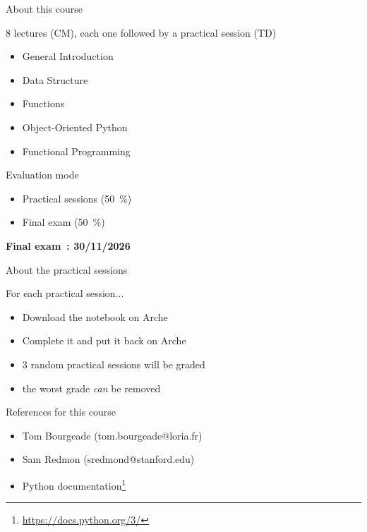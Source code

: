 \documentclass[serif, aspectratio=169]{beamer}
\begin{document}
\begin{frame}{About this course} %
    \begin{block}{8 lectures (CM), each one followed by a practical session (TD)}
        \begin{itemize}
            \item General Introduction
            \item Data Structure
            \item Functions
            \item Object-Oriented Python
            \item Functional Programming
        \end{itemize}
    \end{block}
    \pause
    \begin{block}{Evaluation mode}
        \begin{itemize}
            \item Practical sessions (50~\%) 
            \item Final exam (50~\%)
        \end{itemize}
    \end{block}
    \pause
    \hfill \textbf{Final exam~: 30/11/2026}
\end{frame}

\begin{frame}{About the practical sessions}
    \begin{block}{For each practical session...}
        \begin{itemize}
            \item Download the notebook on Arche
            \item Complete it and put it back on Arche
        \end{itemize}
    \end{block}
    \begin{block}{}
        \begin{itemize}
            \item 3 random practical sessions will be graded
            \item the worst grade \textit{can} be removed
        \end{itemize}
    \end{block}
\end{frame}

\begin{frame}{References for this course}
    \begin{block}{}
        \begin{itemize}
            \item Tom Bourgeade (tom.bourgeade@loria.fr)
            \item Sam Redmon (sredmond@stanford.edu)
            \item Python documentation\footnote{\url{https://docs.python.org/3/}}
        \end{itemize}
    \end{block}
\end{frame}
\end{document}
